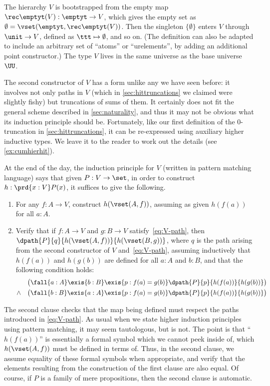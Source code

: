 The hierarchy $V$ is
bootstrapped from the empty map $\rec\emptyt(V) : \emptyt \to V$, which gives the empty set as $\emptyset = \vset(\emptyt,\rec\emptyt(V))$.
Then the singleton $\{\emptyset\}$ enters $V$ through $\unit \to V$, defined as $\ttt \mapsto \emptyset$, and so
on.
(The definition can also be adapted to include an arbitrary set of ``atoms'' or ``urelements'', by adding an additional point constructor.)
The type $V$ lives in the same universe as the base universe $\UU$.

The second constructor of $V$ has a form unlike any we have seen before: it involves not only paths in $V$ (which in \cref{sec:hittruncations} we claimed were slightly fishy) but truncations of sums of them.
It certainly does not fit the general scheme described in \cref{sec:naturality}, and thus it may not be obvious what its induction principle should be.
Fortunately, like our first definition of the 0-truncation in \cref{sec:hittruncations}, it can be re-expressed using auxiliary higher inductive types.
We leave it to the reader to work out the details (see \cref{ex:cumhierhit}).

%
At the end of the day, the induction principle for $V$ (written in pattern matching language) says that given $P:V\to \set$, in order to construct $h:\prd{x:V} P(x)$, it suffices to give the following.
\begin{enumerate}
\item For any $f:A\to V$, construct $h(\vset(A,f))$, assuming as given $h(f(a))$ for all $a:A$.
\item Verify that if $f : A \to V$ and $g : B \to V$ satisfy~\eqref{eq:V-path}, then $\dpath{P}{q}{h(\vset(A,f))}{h(\vset(B,g))}$, where $q$ is the path arising from the second constructor of $V$ and~\eqref{eq:V-path}, assuming inductively that $h(f(a))$ and $h(g(b))$ are defined for all $a:A$ and $b:B$, and that the following condition holds:
\begin{eqnarray*}
    &       & \big(\fall{a:A} \exis{b:B} \exis{p:f(a)=g(b)} \dpath{P}{p}{h(f(a))}{h(g(b))}\big) \\
    & \land & \big(\fall{b:B} \exis{a:A} \exis{p:f(a)=g(b)} \dpath{P}{p}{h(f(a))}{h(g(b))}\big)
\end{eqnarray*}
\end{enumerate}
The second clause checks that the map being defined must respect the paths introduced in \eqref{eq:V-path}.
As usual when we state higher induction principles using pattern matching, it may seem tautologous, but is not.
The point is that ``$h(f(a))$'' is essentially a formal symbol which we cannot peek inside of, which $h(\vset(A,f))$ must be defined in terms of. Thus, in the second clause, we assume equality of these formal symbols when appropriate, and verify that the elements resulting from the construction of the first clause are also equal.
Of course, if $P$ is a family of mere propositions, then the second clause is automatic.

